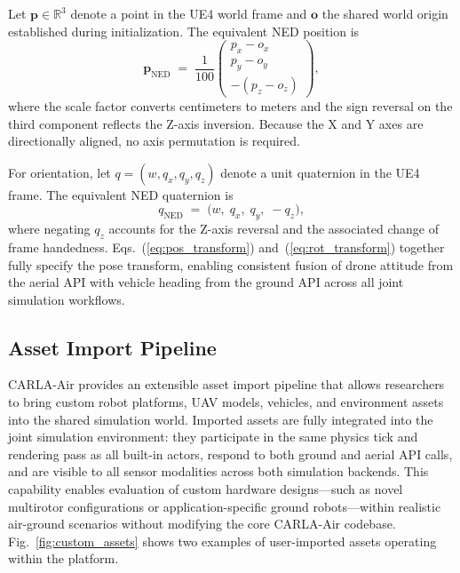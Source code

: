 

Let $\mathbf{p} \in \mathbb{R}^3$ denote a point in the UE4 world frame and
$\mathbf{o}$ the shared world origin established during initialization.
The equivalent NED position is
%
\begin{equation}
  \mathbf{p}_{\mathrm{NED}}
  \;=\; \frac{1}{100}
  \begin{pmatrix} p_x - o_x \\ p_y - o_y \\ -(p_z - o_z) \end{pmatrix},
  \label{eq:pos_transform}
\end{equation}
%
\noindent where the scale factor converts centimeters to meters and the sign
reversal on the third component reflects the Z-axis inversion.
Because the X and Y axes are directionally aligned, no axis permutation is
required.

For orientation, let $q = (w, q_x, q_y, q_z)$ denote a unit quaternion in the
UE4 frame.
The equivalent NED quaternion is
%
\begin{equation}
  q_{\mathrm{NED}} \;=\; \bigl(w,\; q_x,\; q_y,\; -q_z\bigr),
  \label{eq:rot_transform}
\end{equation}
%
\noindent where negating $q_z$ accounts for the Z-axis reversal and the
associated change of frame handedness.
Eqs.~(\ref{eq:pos_transform}) and~(\ref{eq:rot_transform}) together fully
specify the pose transform, enabling consistent fusion of drone attitude from
the aerial API with vehicle heading from the ground API across all joint
simulation workflows.

\subsection{Asset Import Pipeline}
\label{sec:arch:assets}

CARLA-Air provides an extensible asset import pipeline that allows researchers
to bring custom robot platforms, UAV models, vehicles, and environment assets
into the shared simulation world. Imported assets are fully integrated into the
joint simulation environment: they participate in the same physics tick and
rendering pass as all built-in actors, respond to both ground and aerial API
calls, and are visible to all sensor modalities across both simulation
backends. This capability enables evaluation of custom hardware designs---such
as novel multirotor configurations or application-specific ground
robots---within realistic air-ground scenarios without modifying the core
CARLA-Air codebase. Fig.~\ref{fig:custom_assets} shows two examples of
user-imported assets operating within the platform.
